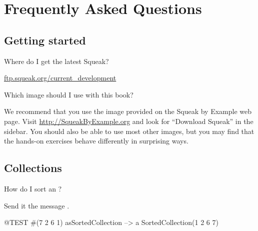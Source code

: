 \documentclass[a4paper,10pt,twoside]{book}
\begin{document}
	\renewcommand{\nnbb}[2]{} %
	\sloppy
\fi
\chapter{Frequently Asked Questions}
\label{app:faq}


\section{Getting started}
\begin{faq}
Where do I get the latest Squeak?
\end{faq}
\answer
\url{ftp.squeak.org/current_development}

\begin{faq}
Which \sq image should I use with this book?
\end{faq}
\answer
We recommend that you use the image provided on the Squeak by Example web page.
Visit \url{http://SqueakByExample.org} and look for ``Download Squeak'' in the sidebar.
You should also be able to use most other images, but you may find that the hands-on exercises behave differently in surprising ways.


\section{Collections}

\begin{faq}
How do I sort an ?
\end{faq}
\answer
Send it the message .

\begin{code}{@TEST}
#(7 2 6 1) asSortedCollection --> a SortedCollection(1 2 6 7)
\end{code}
\end{document}

